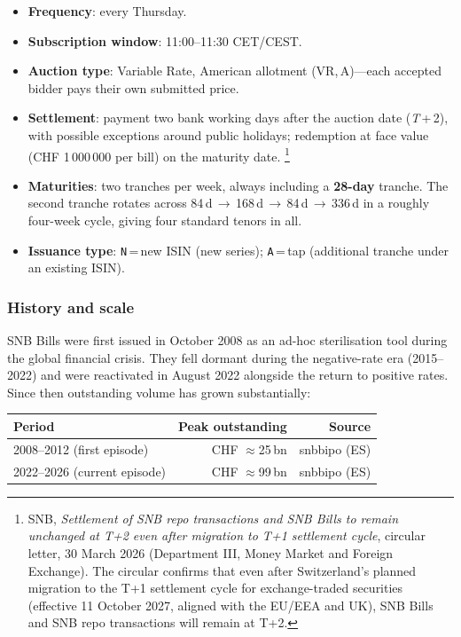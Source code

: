 \documentclass[12pt,a4paper]{article}
\begin{document}
\begin{itemize}[leftmargin=1.5em, itemsep=2pt]
  \item \textbf{Frequency}: every Thursday.
  \item \textbf{Subscription window}: 11:00--11:30 CET/CEST.
  \item \textbf{Auction type}: Variable Rate, American allotment (VR,\,A)---each
    accepted bidder pays their own submitted price.
  \item \textbf{Settlement}: payment two bank working days after the auction
    date (\textit{T}\,+\,2), with possible exceptions around public holidays;
    redemption at face value (CHF 1\,000\,000 per bill) on the maturity date.%
    \footnote{SNB, \textit{Settlement of SNB repo transactions and SNB Bills to
    remain unchanged at T+2 even after migration to T+1 settlement cycle},
    circular letter, 30 March 2026 (Department III, Money Market and Foreign
    Exchange).  The circular confirms that even after Switzerland's planned
    migration to the T+1 settlement cycle for exchange-traded securities
    (effective 11 October 2027, aligned with the EU/EEA and UK), SNB Bills and
    SNB repo transactions will remain at T+2.}
  \item \textbf{Maturities}: two tranches per week, always including a
    \textbf{28-day} tranche.  The second tranche rotates across
    84\,d\,$\to$\,168\,d\,$\to$\,84\,d\,$\to$\,336\,d in a roughly four-week
    cycle, giving four standard tenors in all.
  \item \textbf{Issuance type}: \texttt{N}\,=\,new ISIN (new series);
    \texttt{A}\,=\,tap (additional tranche under an existing ISIN).
\end{itemize}

\subsubsection{History and scale}

SNB Bills were first issued in October 2008 as an ad-hoc sterilisation tool
during the global financial crisis.  They fell dormant during the negative-rate
era (2015--2022) and were reactivated in August 2022 alongside the return to
positive rates.  Since then outstanding volume has grown substantially:

\begin{center}
\begin{tabular}{lrr}
  \toprule
  Period & Peak outstanding & Source \\
  \midrule
  2008--2012 (first episode) & CHF $\approx$25\,bn   & snbbipo (ES) \\
  2022--2026 (current episode) & CHF $\approx$99\,bn & snbbipo (ES) \\
  \bottomrule
\end{tabular}
\end{center}
\end{document}
